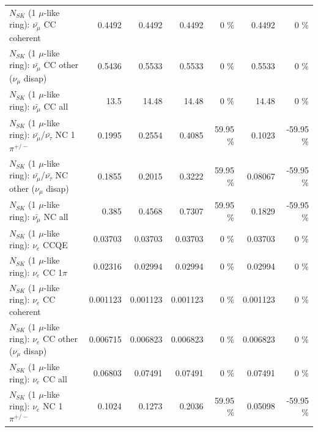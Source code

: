 \begin{table}
\begin{tabular}{| l | r | r | r  r | r  r |}
                       $N_{SK}$ (1 $\mu$-like ring): $\bar{\nu_\mu}$ CC coherent &          0.4492 &          0.4492 &          0.4492 &        0 \%  &          0.4492 &        0 \%  \\ 
        $N_{SK}$ (1 $\mu$-like ring): $\bar{\nu_\mu}$ CC other ($\nu_\mu$ disap) &          0.5436 &          0.5533 &          0.5533 &        0 \%  &          0.5533 &        0 \%  \\ 
                          $N_{SK}$ (1 $\mu$-like ring): $\bar{\nu_{\mu}}$ CC all &            13.5 &           14.48 &           14.48 &        0 \%  &           14.48 &        0 \%  \\ 
\hline
  $N_{SK}$ (1 $\mu$-like ring): $\bar{\nu_\mu}$/$\bar{\nu_\tau}$ NC 1$\pi^{+/-}$ &          0.1995 &          0.2554 &          0.4085 &    59.95 \%  &          0.1023 &   -59.95 \%  \\ 
$N_{SK}$ (1 $\mu$-like ring): $\bar{\nu_\mu}$/$\bar{\nu_\tau}$ NC other ($\nu_\mu$ disap) &          0.1855 &          0.2015 &          0.3222 &    59.95 \%  &         0.08067 &   -59.95 \%  \\ 
                          $N_{SK}$ (1 $\mu$-like ring): $\bar{\nu_{\mu}}$ NC all &           0.385 &          0.4568 &          0.7307 &    59.95 \%  &          0.1829 &   -59.95 \%  \\ 
\hline
\hline
\hline
                                      $N_{SK}$ (1 $\mu$-like ring): $\nu_e$ CCQE &         0.03703 &         0.03703 &         0.03703 &        0 \%  &         0.03703 &        0 \%  \\ 
                                 $N_{SK}$ (1 $\mu$-like ring): $\nu_e$ CC 1$\pi$ &         0.02316 &         0.02994 &         0.02994 &        0 \%  &         0.02994 &        0 \%  \\ 
                               $N_{SK}$ (1 $\mu$-like ring): $\nu_e$ CC coherent &        0.001123 &        0.001123 &        0.001123 &        0 \%  &        0.001123 &        0 \%  \\ 
                $N_{SK}$ (1 $\mu$-like ring): $\nu_e$ CC other ($\nu_\mu$ disap) &        0.006715 &        0.006823 &        0.006823 &        0 \%  &        0.006823 &        0 \%  \\ 
                                  $N_{SK}$ (1 $\mu$-like ring): $\nu_{e}$ CC all &         0.06803 &         0.07491 &         0.07491 &        0 \%  &         0.07491 &        0 \%  \\ 
\hline
                           $N_{SK}$ (1 $\mu$-like ring): $\nu_e$ NC 1$\pi^{+/-}$ &          0.1024 &          0.1273 &          0.2036 &    59.95 \%  &         0.05098 &   -59.95 \%  \\ 

\end{tabular}
\end{table}
